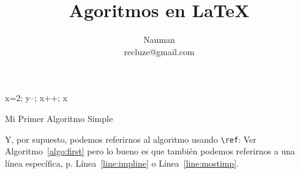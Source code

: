 \documentclass{article}
\begin{document}
\title{Agoritmos en \LaTeX}
\author{Nauman \\ recluze@gmail.com}
\maketitle



\begin{algorithm}
\begin{algorithmic}

\STATE x=2;
   \STATE y--;
   \STATE x++;		\label{line:impline}
\ELSE
   \RETURN x		\label{line:mostimp}
\ENDIF
\end{algorithmic}
\caption{Mi Primer Algoritmo Simple}
\label{algo:first}
\end{algorithm}

Y, por supuesto, podemos referirnos al algoritmo usando \verb|\ref|: Ver Algoritmo~\ref{algo:first} pero lo bueno es que también podemos referirnos a una línea específica, p. Línea~\ref{line:impline} o Línea~\ref{line:mostimp}.
\end{document}
